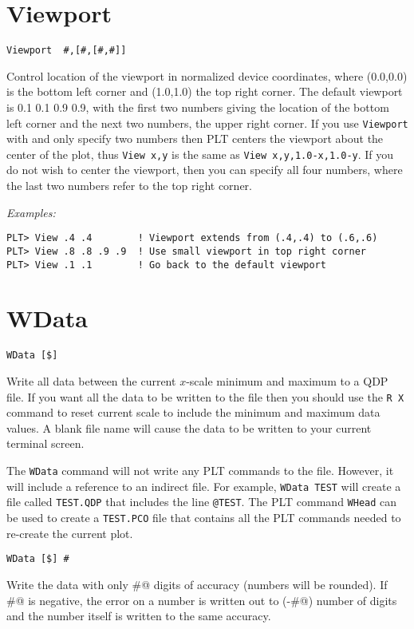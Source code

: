 \section*{Viewport}
\begin{verbatim}
Viewport  #,[#,[#,#]]
\end{verbatim}
   Control location of the viewport in normalized device coordinates,
where (0.0,0.0) is the bottom left corner and (1.0,1.0) the top right
corner.  The default viewport is 0.1 0.1 0.9 0.9, with the first two
numbers giving the location of the bottom left corner and the next
two numbers, the upper right corner.  If you use {\tt Viewport} with and
only specify two numbers then PLT centers the viewport about the center
of the plot, thus {\tt View~x,y} is the same as {\tt View~x,y,1.0-x,1.0-y}.
If you do not wish to center the viewport, then you can specify all
four numbers, where the last two numbers refer to the top right corner.

\medskip\noindent
{\em Examples:}
\begin{verbatim}
PLT> View .4 .4        ! Viewport extends from (.4,.4) to (.6,.6)
PLT> View .8 .8 .9 .9  ! Use small viewport in top right corner
PLT> View .1 .1        ! Go back to the default viewport
\end{verbatim}

\section*{WData}
\begin{verbatim}
WData [$]
\end{verbatim}
   Write all data between the current $x$-scale minimum and maximum
to a QDP file.  If you want all the data to be written to the file
then you should use the {\tt R~X} command to reset current scale to include
the minimum and maximum data values.  A blank file name will cause
the data to be written to your current terminal screen.

The {\tt WData} command will not write any PLT commands to the file.
However, it will include a reference to an indirect file.  For example,
{\tt WData~TEST} will create a file called {\tt TEST.QDP} that includes the
line {\tt @TEST}.  The PLT command {\tt WHead} can be used to create a {\tt TEST.PCO}
file that contains all the PLT commands needed to re-create the current
plot.

\medskip
\begin{verbatim}
WData [$] #
\end{verbatim}
   Write the data with only \verb@#@ digits of accuracy (numbers will be
rounded).  If \verb@#@ is negative, the error on a number is written out to
(-\verb@#@) number of digits and the number itself is written to the same
accuracy.

